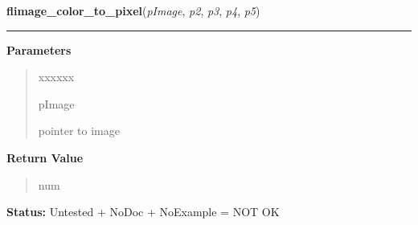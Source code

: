 \hspace{.8\funcindent}\begin{boxedminipage}{\funcwidth}

    \raggedright \textbf{flimage\_color\_to\_pixel}(\textit{pImage}, \textit{p2}, \textit{p3}, \textit{p4}, \textit{p5})

    \vspace{-1.5ex}

    \rule{\textwidth}{0.5\fboxrule}
\setlength{\parskip}{2ex}
\setlength{\parskip}{1ex}
      \textbf{Parameters}
      \vspace{-1ex}

      \begin{quote}
        \begin{Ventry}{xxxxxx}

          \item[pImage]

          pointer to image

        \end{Ventry}

      \end{quote}

      \textbf{Return Value}
    \vspace{-1ex}

      \begin{quote}
      num

      \end{quote}

\textbf{Status:} Untested + NoDoc + NoExample = NOT OK



    \end{boxedminipage}

    \label{xformslib:library:flimage_combine}

    \vspace{0.5ex}

